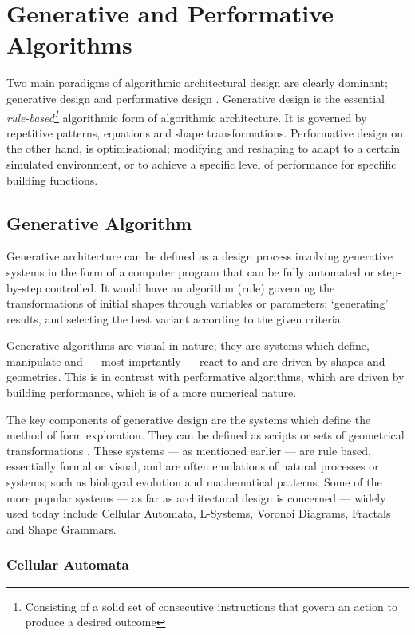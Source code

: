 \chapter{Generative and Performative Algorithms}

Two main paradigms of algorithmic architectural design are clearly dominant; generative design and performative design \cite{fasoulaki08}. Generative design is the essential \emph{rule-based\footnote{Consisting of a solid set of consecutive instructions that govern an action to produce a desired outcome}} algorithmic form of algorithmic architecture. It is governed by repetitive patterns, equations and shape transformations.  Performative design on the other hand, is optimisational; modifying and reshaping to adapt to a certain simulated environment, or to achieve a specific level of performance for specfific building functions.

\section{Generative Algorithm}

Generative architecture can be defined as a design process involving generative systems in the form of a computer program that can be fully automated or step-by-step controlled. It would have an algorithm (rule) governing the transformations of initial shapes through variables or parameters; `generating' results, and selecting the best variant according to the given criteria. \cite{arida04}

Generative algorithms are visual in nature; they are systems which define, manipulate and --- most imprtantly --- react to and are driven by shapes and geometries. This is in contrast with performative algorithms, which are driven by building performance, which is of a more numerical nature. 

The key components of generative design are the systems which define the method of form exploration. They can be defined as scripts or sets of geometrical transformations \cite{arida04}. These systems --- as mentioned earlier --- are rule based, essentially formal or visual, and are often emulations of natural processes or systems; such as biologcal evolution and mathematical patterns. Some of the more popular systems --- as far as architectural design is concerned --- widely used today include Cellular Automata, L-Systems, Voronoi Diagrams, Fractals and Shape Grammars.

\clearpage
\subsection{Cellular Automata}

